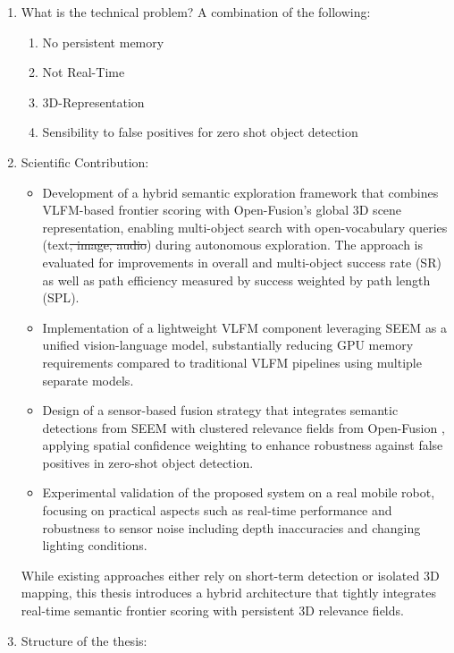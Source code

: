 \begin{enumerate}
    \item What is the technical problem? A combination of the following:
    \begin{enumerate}
        \item No persistent memory
        \item Not Real-Time
        \item 3D-Representation
        \item Sensibility to false positives for zero shot object detection
    \end{enumerate}
    \item Scientific Contribution:
    \begin{itemize}
        \item Development of a hybrid semantic exploration framework that combines \ac{VLFM}-based \cite{yokoyama2024vlfm} frontier scoring with Open-Fusion's \cite{kashu2023openfusion} global 3D scene representation, enabling multi-object search with open-vocabulary queries (text\sout{, image, audio}) during autonomous exploration. The approach is evaluated for improvements in overall and multi-object success rate (\ac{SR}) as well as path efficiency measured by success weighted by path length (\ac{SPL}).
        \item Implementation of a lightweight \ac{VLFM} \cite{yokoyama2024vlfm} component leveraging \ac{SEEM} \cite{zou2023seem} as a unified vision-language model, substantially reducing GPU memory requirements compared to traditional \ac{VLFM} \cite{yokoyama2024vlfm} pipelines using multiple separate models.
        \item Design of a sensor-based fusion strategy that integrates semantic detections from \ac{SEEM} \cite{zou2023seem} with clustered relevance fields from Open-Fusion \cite{kashu2023openfusion}, applying spatial confidence weighting to enhance robustness against false positives in zero-shot object detection.
        \item Experimental validation of the proposed system on a real mobile robot, focusing on practical aspects such as real-time performance and robustness to sensor noise including depth inaccuracies and changing lighting conditions.
    \end{itemize}

    While existing approaches either rely on short-term detection or isolated 3D mapping, this thesis introduces a hybrid architecture that tightly integrates real-time semantic frontier scoring with persistent 3D relevance fields.

    \item Structure of the thesis:
\end{enumerate}
